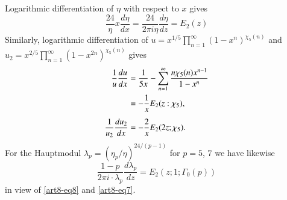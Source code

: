 Logarithmic differentiation of $\eta$ with respect to $x$ gives
\setcounter{equation}{7}
\begin{equation}
\frac{24}{\eta}x\dfrac{d\eta}{dx}=\dfrac{24}{2\pi i\eta}\dfrac{d\eta}{dz}=E_{2}(z)\label{art8-eq8}
\end{equation}
Similarly, logarithmic differentiation of $u=x^{1/5}\prod\limits^{\infty}_{n=1}(1-x^{n})^{\chi_{5}(n)}$ and $u_{2}=x^{2/5}\prod\limits^{\infty}_{n=1}(1-x^{2n})^{\chi_{5}(n)}$ gives
\begin{align}
\frac{1}{u}\dfrac{du}{dx} &= \frac{1}{5x}-\sum\limits^{\infty}_{n=1}\frac{n\chi_{5}(n)x^{n-1}}{1-x^{n}}\label{art8-eq9}\\
&= -\frac{1}{x}E_{2}(z:\chi_{5}),\notag\\[4pt]
\frac{1}{u_{2}}\frac{du_{2}}{dx} &= -\frac{2}{x}E_{2}(2z;\chi_{5}).\notag
\end{align}
For the Hauptmodul $\lambda_{p}=(\eta_{p}/\eta)^{24/(p-1)}$ for $p=5$, $7$ we have likewise
\begin{equation}
\frac{1-p}{2\pi i\cdot \lambda_{p}}\frac{d\lambda_{p}}{dz}=E_{2}(z;1;\Gamma_{0}(p))\label{art8-eq10}
\end{equation}
in view of \eqref{art8-eq8} and \eqref{art8-eq7}.

